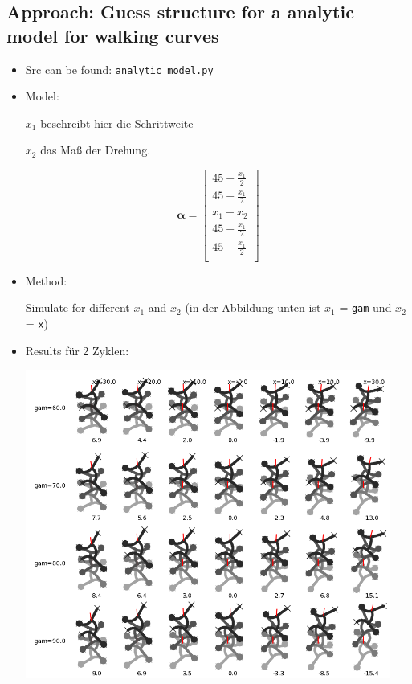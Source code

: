 \documentclass[10pt,a4paper]{article}
\begin{document}
\subsection{Approach: Guess structure for a analytic model for walking curves}

\begin{itemize}

\item Src can be found: \texttt{analytic\_model.py}

\item Model:

$x_1$ beschreibt hier die Schrittweite

$x_2$ das Maß der Drehung.

\begin{equation}
\bm{\alpha} = \begin{bmatrix}
45 - \frac{x_1}{2} \\
45 + \frac{x_1}{2} \\
x_1 + x_2 \\
45 - \frac{x_1}{2}  \\
45 + \frac{x_1}{2} \\
\end{bmatrix}
\end{equation}

\item Method:

Simulate for different $x_1$ and $x_2$ (in der Abbildung unten ist $x_1$ = \texttt{gam} und $x_2$ = \texttt{x})

\item Results für 2 Zyklen:

\includegraphics[width=12cm]{pics/model_1/GeckoBotGait_2cyc.png}



\end{itemize}
\end{document}
